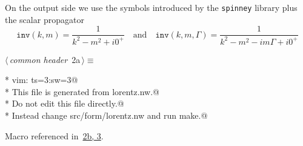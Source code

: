 \documentclass[a4paper,12pt]{amsart}
\renewcommand{\NWtarget}[2]{\hypertarget{#1}{#2}}
\renewcommand{\NWlink}[2]{\hyperlink{#1}{#2}}
\renewcommand{\NWtxtMacroRefIn}{Macro referenced in}
\renewcommand{\NWsep}{${\diamond}$}
\begin{document}
On the output side we use the symbols introduced by the \texttt{spinney}
library plus the scalar propagator
\begin{equation}
\mathtt{inv}(k, m) = \frac{1}{k^2-m^2+i0^+}\quad\text{and}\quad
\mathtt{inv}(k, m,\Gamma) = \frac{1}{k^2-m^2-im\Gamma+i0^+}
\end{equation}
\begin{flushleft} \small
\begin{minipage}{\linewidth}\label{scrap1}\raggedright\small
\NWtarget{nuweb2a}{} $\langle\,${\itshape common header}\nobreak\ {\footnotesize {2a}}$\,\rangle\equiv$
\vspace{-1ex}
\begin{list}{}{} \item
\mbox{}\verb@* vim: ts=3:sw=3@\\
\mbox{}\verb@* This file is generated from lorentz.nw.@\\
\mbox{}\verb@* Do not edit this file directly.@\\
\mbox{}\verb@* Instead change src/form/lorentz.nw and run make.@\\
\mbox{}\verb@@{\NWsep}
\end{list}
\vspace{-1.5ex}
\footnotesize
\begin{list}{}{\setlength{\itemsep}{-\parsep}\setlength{\itemindent}{-\leftmargin}}
\item \NWtxtMacroRefIn\ \NWlink{nuweb2b}{2b}\NWlink{nuweb3}{, 3}.

\item{}
\end{list}
\end{minipage}\vspace{4ex}
\end{flushleft}
\end{document}
